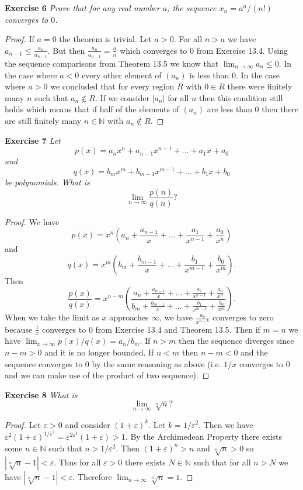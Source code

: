 \documentclass{article}
\begin{document}
\begin{flushleft}
\textbf{Exercise 6}
\textsl{Prove that for any real number $a$, the sequence $x_n = a^n/(n!)$ converges to $0$.}
\begin{proof}
If $a=0$ the theorem is trivial. Let $a>0$. For all $n > a$ we have $a_{n-1} \leq \frac{a_n}{a_{n-1}}$. But then $\frac{a_n}{a_{n-1}} = \frac{a}{n}$ which converges to $0$ from Exercise 13.4. Using the sequence comparisons from Theorem 13.5 we know that $\lim_{n \rightarrow \infty} a_n \leq 0$. In the case where $a<0$ every other element of $(a_n)$ is less than $0$. In the case where $a>0$ we concluded that for every region $R$ with $0 \in R$ there were finitely many $n$ such that $a_n \notin R$. If we consider $|a_n|$ for all $n$ then this condition still holds which means that if half of the elements of $(a_n)$ are less than $0$ then there are still finitely many $n \in \mathbb{N}$ with $a_n \notin R$.
\end{proof}


\textbf{Exercise 7}
\textsl{Let
\[
p(x) = a_n x^n + a_{n-1} x^{n-1} + \dots + a_1 x + a_0
\]
and
\[
q(x) = b_m x^m + b_{m-1} x^{m-1} + \dots + b_1 x + b_0
\]
be polynomials. What is
\[
\lim_{n \rightarrow \infty} \frac{p(n)}{q(n)}?
\]}
\begin{proof}
We have
\[
p(x) = x^n(a_n + \frac{a_{n-1}}{x} + \dots + \frac{a_1}{x^{n-1}} + \frac{a_0}{x^n})
\]
and
\[
q(x) = x^m(b_m + \frac{b_{m-1}}{x} + \dots + \frac{b_1}{x^{m-1}} + \frac{b_0}{x^m}).
\]
Then
\[
\frac{p(x)}{q(x)}=x^{n-m} \left ( \frac{a_n + \frac{a_{n-1}}{x} + \dots + \frac{a_1}{x^{n-1}} + \frac{a_0}{x^n}}{b_m + \frac{b_{m-1}}{x} + \dots + \frac{b_1}{x^{m-1}} + \frac{b_0}{x^m}} \right ).
\]
When we take the limit as $x$ approaches $\infty$, we have $\frac{a_k}{x^{n-k}}$ converges to zero because $\frac{1}{x}$ converges to $0$ from Exercise 13.4 and Theorem 13.5. Then if $m=n$ we have $\lim_{x \rightarrow \infty} p(x)/q(x) = a_n/b_m$. If $n>m$ then the sequence diverges since $n-m>0$ and it is no longer bounded. If $n<m$ then $n-m<0$ and the sequence converges to $0$ by the same reasoning as above (i.e. $1/x$ converges to $0$ and we can make use of the product of two sequence).
\end{proof}

\textbf{Exercise 8}
\textsl{What is
\[
\lim_{n \rightarrow \infty} \sqrt[n]{n}?
\]}
\begin{proof}
Let $\varepsilon > 0$ and consider $(1+\varepsilon)^k$. Let $k=1/\varepsilon^2$. Then we have $\varepsilon^2 (1 + \varepsilon)^{1/\varepsilon^2}=\varepsilon^{2\varepsilon^2}(1+\varepsilon) > 1$. By the Archimedean Property there exists some $n \in \mathbb{N}$ such that $n > 1/\varepsilon^2$. Then $(1+\varepsilon)^n > n$ and $\sqrt[n]{n} > 0$ so $|\sqrt[n]{n}-1| < \varepsilon$. Thus for all $\varepsilon > 0$ there exists $N \in \mathbb{N}$ such that for all $n > N$ we have $|\sqrt[n]{n} - 1| < \varepsilon$. Therefore $\lim_{n \rightarrow \infty} \sqrt[n]{n} = 1$.
\end{proof}

\end{flushleft}
\end{document}
